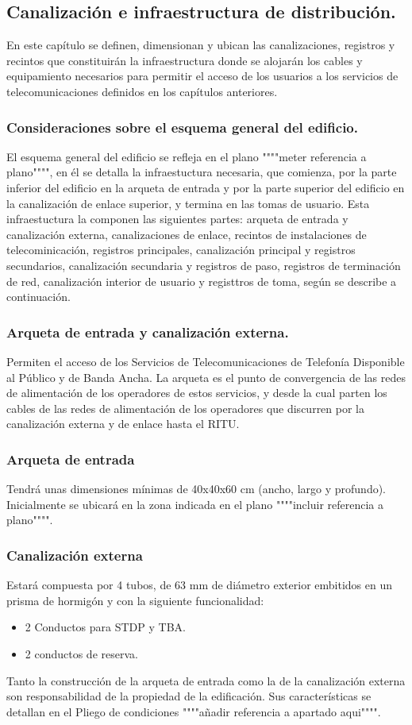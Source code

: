 \subsection{Canalización e infraestructura de distribución.}
En este capítulo se definen, dimensionan y ubican las canalizaciones, registros y recintos que constituirán la infraestructura donde se alojarán los cables y equipamiento necesarios para permitir el acceso de los usuarios a los servicios de telecomunicaciones definidos en los capítulos anteriores.
\subsubsection{Consideraciones sobre el esquema general del edificio.}
El esquema general del edificio se refleja en el plano """"meter referencia a plano"""", en él se detalla la infraestuctura necesaria, que comienza, por la parte inferior del edificio en la arqueta de entrada y por la parte superior del edificio en la canalización de enlace superior, y termina en las tomas de usuario. Esta infraestuctura la componen las siguientes partes: arqueta de entrada y canalización externa, canalizaciones de enlace, recintos de instalaciones de telecominicación, registros principales, canalización principal y registros secundarios, canalización secundaria y registros de paso, registros de terminación de red, canalización interior de usuario y registtros de toma, según se describe a continuación.
\subsubsection{Arqueta de entrada y canalización externa.}
Permiten el acceso de los Servicios de Telecomunicaciones de Telefonía Disponible al Público y de Banda Ancha. La arqueta es el punto de convergencia de las redes de alimentación de los operadores de estos servicios, y desde la cual parten los cables de las redes de alimentación de los operadores que discurren por la canalización externa y de enlace hasta el RITU.

\subsubsection*{Arqueta de entrada}
Tendrá unas dimensiones mínimas de 40x40x60 cm (ancho, largo y profundo). Inicialmente se ubicará en la zona indicada en el plano """"incluir referencia a plano"""".
\subsubsection*{Canalización externa}
Estará compuesta por 4 tubos, de 63 mm de diámetro exterior embitidos en un prisma de hormigón y con la siguiente funcionalidad:
\begin{itemize}
	\item 2 Conductos para STDP y TBA.
	\item 2 conductos de reserva.
\end{itemize}
Tanto la construcción de la arqueta de entrada como la de la canalización externa son responsabilidad de la propiedad de la edificación.
Sus características se detallan en el Pliego de condiciones """"añadir referencia a apartado aqui"""".
